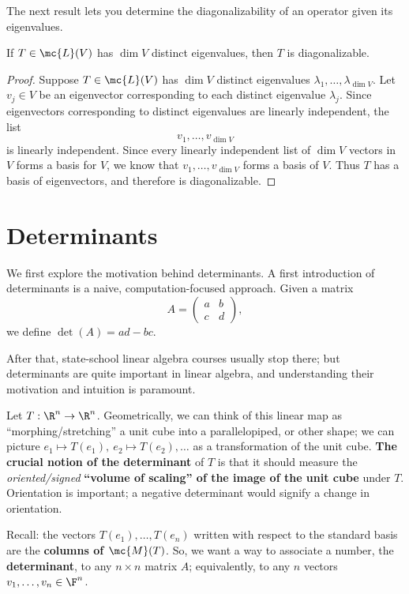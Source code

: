 \documentclass[math0540-lecture-notes.tex]{subfiles}
\begin{document}
The next result lets you determine the diagonalizability of an operator given its eigenvalues.
\begin{theorem}{}
  If $T\in \mc{L}(V)$ has $\dim{V}$ distinct eigenvalues, then $T$ is diagonalizable.
\end{theorem}
\begin{proof}[Proof]
  Suppose $T\in \mc{L}(V)$ has $\dim{V}$ distinct eigenvalues $\lambda_1,\ldots,\lambda_{\dim{V}}$.
  Let $v_j\in V$ be an eigenvector corresponding to each distinct eigenvalue $\lambda_j$. Since
  eigenvectors corresponding to distinct eigenvalues are linearly independent, the list \[
    v_1,\ldots,v_{\dim{V}}
  \] is linearly independent. Since every linearly independent list of $\dim{V}$ vectors in $V$
  forms a basis for $V$, we know that $v_1,\ldots,v_{\dim{V}}$ forms a basis of $V$. Thus $T$ has a
  basis of eigenvectors, and therefore is diagonalizable.
\end{proof}

\section{Determinants}

We first explore the motivation behind determinants. A first introduction of determinants is a
naive, computation-focused approach. Given a matrix \[
  A = \begin{pmatrix} a&b\\c&d \end{pmatrix} 
,\] we define $\det{(A)}=ad-bc$.

After that, state-school linear algebra courses usually stop there; but determinants are quite
important in linear algebra, and understanding their motivation and intuition is paramount.

Let $T:\R^{n}\to \R^{n}$. Geometrically, we can think of this linear map as ``morphing/stretching''
a unit cube into a parallelopiped, or other shape; we can picture $e_1\mapsto T(e_1),\ e_2\mapsto
T(e_2),\ldots$ as a transformation of the unit cube. \textbf{The crucial notion of the determinant}
of $T$ is that it should measure the \textit{oriented/signed} \textbf{``volume of scaling'' of the
image of the unit cube} under $T$.  Orientation is important; a negative determinant would signify a
change in orientation.

Recall: the vectors $T(e_1),\ldots,T(e_n)$ written with respect to the standard basis are the
\textbf{columns of $\mc{M}(T)$}. So, we want a way to associate a number, the \textbf{determinant},
to any $n\times n$ matrix $A$; equivalently, to any $n$ vectors $v_1,\ldots,v_n\in \F^n$.
\end{document}
